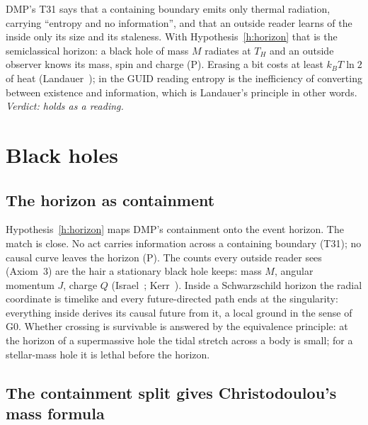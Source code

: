 \documentclass[11pt,a4paper]{article}
\theoremstyle{definition}
\theoremstyle{remark}
\newcommand{\tagP}{\textsf{(P)}}
\theoremstyle{definition}
\begin{document}
DMP's T31 says that a containing boundary emits only thermal radiation, carrying ``entropy and no information'', and that an outside reader
learns of the inside only its size and its staleness. With Hypothesis~\ref{h:horizon} that is the semiclassical horizon: a black hole of mass
$M$ radiates at $T_H$ and an outside observer knows its mass, spin and charge \tagP. Erasing a bit costs at least $k_BT\ln2$ of heat
(Landauer~\cite{landauer}); in the GUID reading entropy is the inefficiency of converting between existence and information, which is
Landauer's principle in other words. \emph{Verdict: holds as a reading.}

\section{Black holes}\label{sec:bh}

\subsection{The horizon as containment}

Hypothesis~\ref{h:horizon} maps DMP's containment onto the event horizon. The match is close. No act carries information across a containing
boundary (T31); no causal curve leaves the horizon \tagP. The counts every outside reader sees (Axiom~3) are the hair a stationary black hole
keeps: mass $M$, angular momentum $J$, charge $Q$ (Israel~\cite{israel}; Kerr~\cite{kerr}). Inside a Schwarzschild horizon the radial
coordinate is timelike and every future-directed path ends at the singularity: everything inside derives its causal future from it, a
local ground in the sense of G0. Whether crossing is survivable is answered by the equivalence principle: at the horizon of a
supermassive hole the tidal stretch across a body is small; for a stellar-mass hole it is lethal before the horizon.

\subsection{The containment split gives Christodoulou's mass formula}
\end{document}
